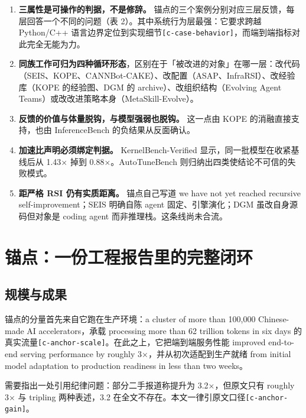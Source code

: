 \begin{enumerate}
  \item \textbf{三属性是可操作的判据，不是修辞。} 锚点的三个案例分别对应三层反馈，每层回答一个不同的问题（表 2）。其中系统行为层最强：它要求跨越 Python/C++ 语言边界定位到实现细节{\scriptsize\texttt{[c-\hspace{0pt}case-\hspace{0pt}behavior]}}，而端到端指标对此完全无能为力。
  \item \textbf{同族工作可归为四种循环形态}，区别在于「被改进的对象」在哪一层：改代码（SEIS、KOPE、CANNBot-CAKE）、改配置（ASAP、InfraRSI）、改经验库（KOPE 的经验图、DGM 的 archive）、改组织结构（Evolving Agent Teams）或改改进策略本身（MetaSkill-Evolve）。
  \item \textbf{反馈的价值与体量脱钩，与模型强弱也脱钩。} 这一点由 KOPE 的消融直接支持，也由 InferenceBench 的负结果从反面确认。
  \item \textbf{加速比声明必须绑定判据。} KernelBench-Verified 显示，同一批模型在收紧基线后从 1.43× 掉到 0.88×。AutoTuneBench 则归纳出四类使结论不可信的失败模式。
  \item \textbf{距严格 RSI 仍有实质距离。} 锚点自己写道 we have not yet reached recursive self-improvement；SEIS 明确自陈 agent 固定、引擎演化；DGM 虽改自身源码但对象是 coding agent 而非推理栈。这条线尚未合流。
\end{enumerate}


\section{锚点：一份工程报告里的完整闭环}

\subsection{规模与成果}

锚点的分量首先来自它跑在生产环境：a cluster of more than 100,000 Chinese-made AI accelerators，承载 processing more than 62 trillion tokens in six days 的真实流量{\scriptsize\texttt{[c-\hspace{0pt}anchor-\hspace{0pt}scale]}}。在此之上，它把端到端服务性能 improved end-to-end serving performance by roughly 3×，并从初次适配到生产就绪 from initial model adaptation to production readiness in less than two weeks。


需要指出一处引用纪律问题：部分二手报道称提升为 3.2×，但原文只有 roughly 3× 与 tripling 两种表述，3.2 在全文不存在。本文一律引原文口径{\scriptsize\texttt{[c-\hspace{0pt}anchor-\hspace{0pt}gain]}}。


